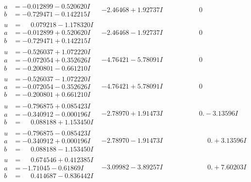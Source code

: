 \documentclass[1p]{elsarticle_modified}
\theoremstyle{definition}
\begin{document}
$$\begin{array}{c|c|c}
\begin{aligned}
a &= -0.012899 - 0.520620 I \\
b &= -0.729471 - 0.142215 I\end{aligned}
 & -2.46468 + 1.92737 I & \phantom{-0.000000 } 0 \\ \hline\begin{aligned}
u &= \phantom{-}0.079218 - 1.178320 I \\
a &= -0.012899 + 0.520620 I \\
b &= -0.729471 + 0.142215 I\end{aligned}
 & -2.46468 - 1.92737 I & \phantom{-0.000000 } 0 \\ \hline\begin{aligned}
u &= -0.526037 + 1.072220 I \\
a &= -0.072054 + 0.352626 I \\
b &= -0.200801 - 0.661210 I\end{aligned}
 & -4.76421 - 5.78091 I & \phantom{-0.000000 } 0 \\ \hline\begin{aligned}
u &= -0.526037 - 1.072220 I \\
a &= -0.072054 - 0.352626 I \\
b &= -0.200801 + 0.661210 I\end{aligned}
 & -4.76421 + 5.78091 I & \phantom{-0.000000 } 0 \\ \hline\begin{aligned}
u &= -0.796875 + 0.085423 I \\
a &= -0.340912 - 0.000196 I \\
b &= \phantom{-}0.088188 + 1.153450 I\end{aligned}
 & -2.78970 + 1.91473 I & \phantom{-0.000000 } 0. - 3.13596 I \\ \hline\begin{aligned}
u &= -0.796875 - 0.085423 I \\
a &= -0.340912 + 0.000196 I \\
b &= \phantom{-}0.088188 - 1.153450 I\end{aligned}
 & -2.78970 - 1.91473 I & \phantom{-0.000000 -}0. + 3.13596 I \\ \hline\begin{aligned}
u &= \phantom{-}0.674546 + 0.412385 I \\
a &= -1.71045 - 0.61869 I \\
b &= \phantom{-}0.414687 - 0.836442 I\end{aligned}
 & -3.09982 - 3.89257 I & \phantom{-0.000000 -}0. + 7.60203 I \\ \hline\begin{aligned}

\end{aligned}
\end{array}$$
\end{document}
